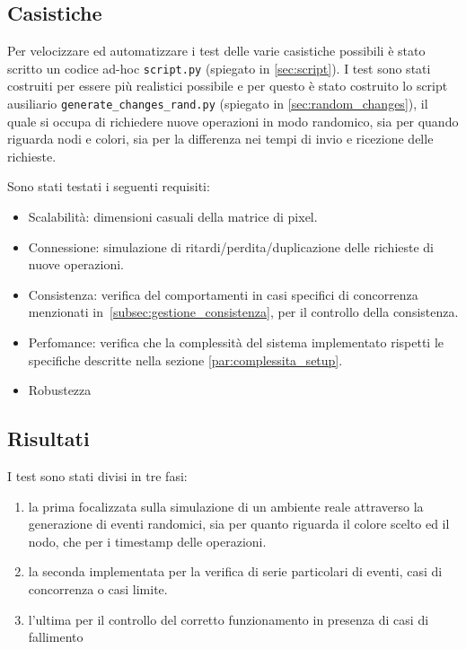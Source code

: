 \documentclass[12pt, a4paper]{report}
\begin{document}
\subsection{Casistiche}

Per velocizzare ed automatizzare i test delle varie casistiche possibili \`e stato scritto un codice ad-hoc \texttt{script.py} (spiegato in \ref{sec:script}). I test sono stati costruiti per essere pi\`u realistici possibile e per questo \`e stato costruito lo script ausiliario \texttt{generate\_changes\_rand.py} (spiegato in \ref{sec:random_changes}), il quale si occupa di richiedere nuove operazioni in modo randomico, sia per quando riguarda nodi e colori, sia per la differenza nei tempi di invio e ricezione delle richieste.

\newpage
Sono stati testati i seguenti requisiti:
\begin{itemize}
    \item Scalabilit\`a: dimensioni casuali della matrice di pixel.
    \item Connessione: simulazione di ritardi/perdita/duplicazione delle richieste di nuove operazioni.
    \item Consistenza: verifica del comportamenti in casi specifici di concorrenza menzionati in~\ref{subsec:gestione_consistenza}, per il controllo della consistenza.
    \item Perfomance: verifica che la complessit\`a del sistema implementato rispetti le specifiche descritte nella sezione \ref{par:complessita_setup}.
    \item Robustezza
\end{itemize}

\subsection{Risultati}



I test sono stati divisi in tre fasi:
\begin{enumerate}
    \item la prima focalizzata sulla simulazione di un ambiente reale attraverso la generazione di eventi randomici, sia per quanto riguarda il colore scelto ed il nodo, che per i timestamp delle operazioni.
    \item la seconda implementata per la verifica di serie particolari di eventi, casi di concorrenza o casi limite.
    \item l'ultima per il controllo del corretto funzionamento in presenza di casi di fallimento
\end{enumerate} 
\end{document}
